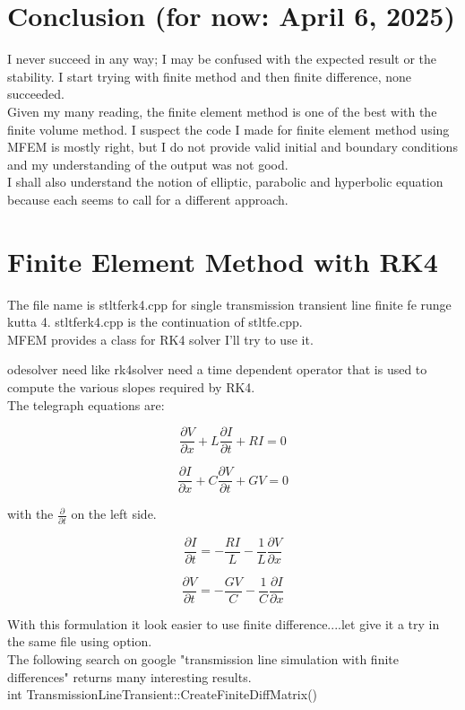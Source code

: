 \documentclass[12pt, letterpaper]{article}
\begin{document}
\section{Conclusion (for now: April 6, 2025)}
I never succeed in any way; I may be confused with the expected result or the stability. I start trying with finite method and then finite difference, none succeeded.\\

Given my many reading, the finite element method is one of the best with the finite volume method. I suspect the code I made for finite element method using MFEM is mostly right, but I do not provide valid initial and boundary conditions and my understanding of the output was not good.\\

I shall also understand the notion of elliptic, parabolic and hyperbolic equation because each seems to call for a different approach.

\section{Finite Element Method with RK4}

The file name is stltferk4.cpp for single transmission transient line finite fe runge kutta 4. stltferk4.cpp is the continuation of stltfe.cpp. \\

MFEM provides a class for RK4 solver I'll try to use it.

odesolver need like rk4solver need a time dependent operator that is used to compute the various slopes required by RK4.\\

The telegraph equations are:

\begin{equation}\frac{\partial{V}}{\partial{x}} + L \frac{\partial{I}}{\partial{t}} + R I = 0\end{equation}


\begin{equation}\frac{\partial{I}}{\partial{x}} + C \frac{\partial{V}}{\partial{t}} + G V = 0\end{equation}

with the $\frac{\partial}{\partial t}$ on the left side.

\begin{equation} \frac{\partial{I}}{\partial{t}} = - \frac{R I}{L} - \frac{1}{L} \frac{\partial{V}}{\partial{x}} \end{equation}


\begin{equation} \frac{\partial{V}}{\partial{t}} = -\frac{G V}{C} - \frac{1}{C} \frac{\partial{I}}{\partial{x}}\end{equation}

With this formulation it look easier to use finite difference....let give it a try in the same file using option.\\

The following search on google "transmission line simulation with finite differences" returns many interesting results.\\

int TransmissionLineTransient::CreateFiniteDiffMatrix()\\
\end{document}
